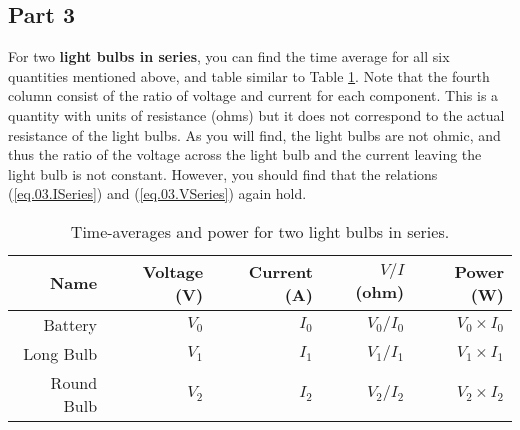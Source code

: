 \subsection{Part 3}
For two \textbf{light bulbs in series}, you can find the time average for all six quantities mentioned above, and table similar to Table \ref{table.03.bulbs.series}. Note that the fourth column consist of the ratio of voltage and current for each component. This is a quantity with units of resistance (ohms) but it does not correspond to the actual resistance of the light bulbs. As you will find, the light bulbs are not ohmic, and thus the ratio of the voltage across the light bulb and the current leaving the light bulb is not constant. However, you should find that the relations (\ref{eq.03.ISeries}) and (\ref{eq.03.VSeries}) again hold.
\begin{table}[ht!]
	\begin{center}
		\begin{tabular}{|r|r|r|r|r|}
			\hline
			Name & Voltage (V) & Current (A) & $V/I$ (ohm) & Power (W) \\
			\hline
			Battery & $V_{0}$ & $I_{0}$ & $V_{0} / I_{0}$ & $V_{0} \times I_{0}$ \\
			Long Bulb & $V_{1}$ & $I_{1}$ & $V_{1} / I_{1}$ & $V_{1} \times I_{1}$ \\
			Round Bulb & $V_{2}$ & $I_{2}$ & $V_{2} / I_{2}$ & $V_{2} \times I_{2}$ \\
			\hline
		\end{tabular}
	\end{center}
	\caption{Time-averages and power for two light bulbs in series.}
	\label{table.03.bulbs.series}
\end{table}
